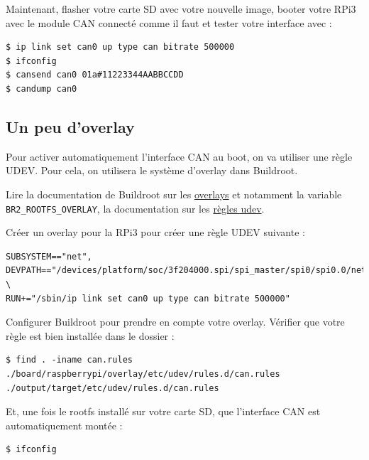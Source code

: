 Maintenant, flasher votre carte SD avec votre nouvelle image, booter votre
RPi3 avec le module CAN connecté comme il faut et tester votre interface
 avec :

\begin{verbatim}
$ ip link set can0 up type can bitrate 500000
$ ifconfig
$ cansend can0 01a#11223344AABBCCDD
$ candump can0
\end{verbatim}

\subsection{Un peu d'overlay}

Pour activer automatiquement l'interface CAN au boot, on va utiliser
une règle UDEV. Pour cela, on utilisera le système d'overlay dans Buildroot.

Lire la documentation de Buildroot sur les
\href{https://buildroot.org/downloads/manual/manual.html#rootfs-custom}{overlays}
et notamment la variable \texttt{BR2\_ROOTFS\_OVERLAY},
la documentation sur les
\href{https://www.linuxembedded.fr/2015/05/une-introduction-a-udev/}{règles udev}.

Créer un overlay pour la RPi3 pour créer une règle UDEV 
suivante :

\begin{verbatim}
SUBSYSTEM=="net", DEVPATH=="/devices/platform/soc/3f204000.spi/spi_master/spi0/spi0.0/net/can0", \
RUN+="/sbin/ip link set can0 up type can bitrate 500000"
\end{verbatim}

Configurer Buildroot pour prendre en compte votre overlay. Vérifier que votre
règle est bien installée dans le dossier \code{target} :

\begin{verbatim}
$ find . -iname can.rules
./board/raspberrypi/overlay/etc/udev/rules.d/can.rules
./output/target/etc/udev/rules.d/can.rules
\end{verbatim}

Et, une fois le rootfs installé sur votre carte SD, que l'interface CAN
est automatiquement montée :
\begin{verbatim}
$ ifconfig
\end{verbatim}
